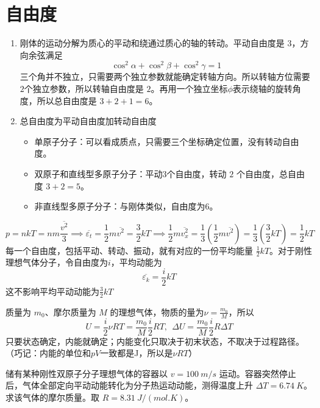 
\section{自由度}

\begin{definition}
\begin{enumerate}
    \item 刚体的运动分解为质心的平动和绕通过质心的轴的转动。平动自由度是 \(3\)，方向余弦满足\[\cos^2\alpha+\cos^2\beta+\cos^2\gamma=1\]三个角并不独立，只需要两个独立参数就能确定转轴方向。所以转轴方位需要\(2\)个独立参数，所以转轴自由度是 \(2\)。再用一个独立坐标$\phi$表示绕轴的旋转角度，所以总自由度是 \(3+2+1=6\)。
    \item 总自由度为平动自由度加转动自由度
    \begin{itemize}
    \item 单原子分子：可以看成质点，只需要三个坐标确定位置，没有转动自由度。
    \item 双原子和直线型多原子分子：平动3个自由度，转动 \(2\) 个自由度，总自由度 \(3+2=5\)。
    \item 非直线型多原子分子：与刚体类似，自由度为6。
    \end{itemize}
\end{enumerate}
\end{definition}

\begin{theorem}[能量按自由度均分原理]
\[p=nkT=nm\frac{\overline{v^2}}{3}\implies \overline{\varepsilon_t}=\frac12m\overline{v^2}=\frac32kT\implies\frac12m\overline{v_x^2}=\frac13\left(\frac12m\overline{v^2}\right)=\frac13\left(\frac32kT\right)=\frac12kT\]每一个自由度，包括平动、转动、振动，就有对应的一份平均能量 \(\frac12kT\)。对于刚性理想气体分子，令自由度为$i$，平均动能为\[\overline{\varepsilon_k}=\frac{i}{2}kT\]这不影响平均平动动能为$\frac32kT$
\end{theorem}

\begin{definition}[理想气体的热力学能，内能]
    质量为 \(m_0\)、摩尔质量为 \(M\) 的理想气体，物质的量为\(\nu=\frac{m_0}{M}\)，所以\[U=\frac{i}{2}\nu RT=\frac{m_0}{M}\frac{i}{2}RT,~~\Delta U=\frac{m_0}{M}\frac{i}{2}R\Delta T\]只要状态确定，内能就确定；内能变化只取决于初末状态，不取决于过程路径。（巧记：内能的单位和$pV$一致都是J，所以是\(\nu RT\)）
\end{definition}



\begin{exercise}[由骤停温升反推刚性双原子气体摩尔质量]
储有某种刚性双原子分子理想气体的容器以 \(v=\SI{100}{m/s}\) 运动。容器突然停止后，气体全部定向平动动能转化为分子热运动动能，测得温度上升 \(\Delta T=\SI{6.74}{K}\)。求该气体的摩尔质量。取 \(R=\SI{8.31}{J/(mol.K)}\)。
\end{exercise}

